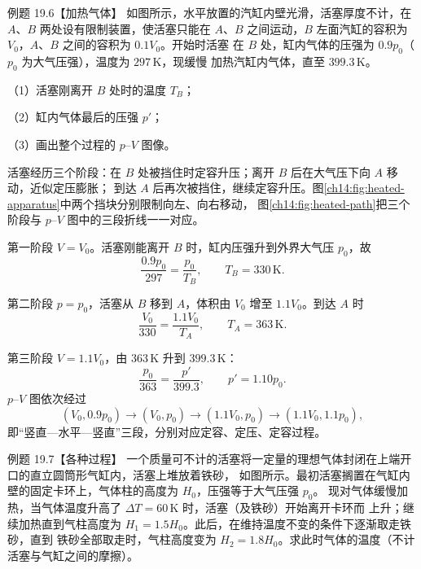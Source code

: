 \begin{origexamplebox}{例题 19.6【加热气体】}
如图所示，水平放置的汽缸内壁光滑，活塞厚度不计，在 $A$、$B$ 两处设有限制装置，使活塞只能在
$A$、$B$ 之间运动，$B$ 左面汽缸的容积为 $V_0$，$A$、$B$ 之间的容积为 $0.1V_0$。开始时活塞
在 $B$ 处，缸内气体的压强为 $0.9p_0$（$p_0$ 为大气压强），温度为 $297\,\mathrm K$，现缓慢
加热汽缸内气体，直至 $399.3\,\mathrm K$。

（1）活塞刚离开 $B$ 处时的温度 $T_B$；

（2）缸内气体最后的压强 $p'$；

（3）画出整个过程的 $p$--$V$ 图像。
\exampleNineteenSixFaithful
\end{origexamplebox}

\begin{xesolution}
活塞经历三个阶段：在 $B$ 处被挡住时定容升压；离开 $B$ 后在大气压下向 $A$ 移动，近似定压膨胀；
到达 $A$ 后再次被挡住，继续定容升压。图\ref{ch14:fig:heated-apparatus}中两个挡块分别限制向左、向右移动，
图\ref{ch14:fig:heated-path}把三个阶段与 $p$--$V$ 图中的三段折线一一对应。

\heatedCylinderDiagram

第一阶段 $V=V_0$。活塞刚能离开 $B$ 时，缸内压强升到外界大气压 $p_0$，故
\begin{equation}
  \frac{0.9p_0}{297}=\frac{p_0}{T_B},\qquad
  \boxed{T_B=330\,\mathrm K}.
\end{equation}

第二阶段 $p=p_0$，活塞从 $B$ 移到 $A$，体积由 $V_0$ 增至 $1.1V_0$。到达 $A$ 时
\begin{equation}
  \frac{V_0}{330}=\frac{1.1V_0}{T_A},\qquad
  T_A=363\,\mathrm K.
\end{equation}

第三阶段 $V=1.1V_0$，由 $363\,\mathrm K$ 升到 $399.3\,\mathrm K$：
\begin{equation}
  \frac{p_0}{363}=\frac{p'}{399.3},\qquad
  \boxed{p'=1.10p_0}.
\end{equation}
$p$--$V$ 图依次经过
\begin{equation}
  (V_0,0.9p_0)\longrightarrow(V_0,p_0)
  \longrightarrow(1.1V_0,p_0)\longrightarrow(1.1V_0,1.1p_0),
\end{equation}
即“竖直—水平—竖直”三段，分别对应定容、定压、定容过程。
\end{xesolution}

\begin{origexamplebox}{例题 19.7【各种过程】}
一个质量可不计的活塞将一定量的理想气体封闭在上端开口的直立圆筒形气缸内，活塞上堆放着铁砂，
如图所示。最初活塞搁置在气缸内壁的固定卡环上，气体柱的高度为 $H_0$，压强等于大气压强 $p_0$。
现对气体缓慢加热，当气体温度升高了 $\Delta T=60\,\mathrm K$ 时，活塞（及铁砂）开始离开卡环而
上升；继续加热直到气柱高度为 $H_1=1.5H_0$。此后，在维持温度不变的条件下逐渐取走铁砂，直到
铁砂全部取走时，气柱高度变为 $H_2=1.8H_0$。求此时气体的温度（不计活塞与气缸之间的摩擦）。
\figureNineteenSevenFaithful
\end{origexamplebox}

